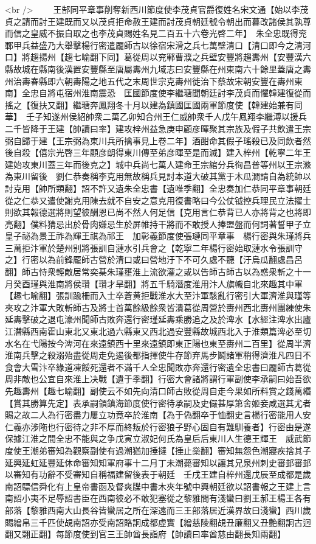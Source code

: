 <br />
　　王郜同平章事削奪新西川節度使李茂貞官爵復姓名宋文通【始以李茂貞之請而討王建既而又以茂貞拒命赦王建而討茂貞朝廷號令朝出而暮改諸侯其孰尊而信之皇威不振自取之也李茂貞賜姓名見二百五十六卷光啓二年】　朱全忠既得兖鄆甲兵益盛乃大舉擊楊行密遣龎師古以徐宿宋滑之兵七萬壁清口【清口即今之清河口】將趨揚州【趨七喻翻下同】葛從周以兖鄆曹濮之兵壁安豐將趨夀州【安豐漢六縣故城在縣南後漢置安豐縣至唐屬夀州九域志曰安豐縣在州東南六十餘里蓋唐之夀州治夀春縣即六朝夀陽之地五代之末周世宗克夀州徙治下蔡故宋朝安豐在夀州東南】全忠自將屯宿州淮南震恐　匡國節度使李繼瑭聞朝廷討李茂貞而懼韓建復從而搖之【復扶又翻】繼瑭奔鳳翔冬十月以建為鎮國匡國兩軍節度使【韓建始兼有同華】　壬子知遂州侯紹帥衆二萬乙卯知合州王仁威帥衆千人戊午鳳翔李繼溥以援兵二千皆降于王建【帥讀曰率】建攻梓州益急庚申顧彦暉聚其宗族及假子共飲遣王宗弼自歸于建【王宗弼為東川兵所擒事見上卷二年】酒酣命其假子瑤殺已及同飲者然後自殺【僖宗光啓三年顧彦朗得東川傳至弟彦暉至是而滅】建入梓州【乾寧二年王建始攻東川蓋三年而後克之】城中兵尚七萬人建命王宗綰分兵徇昌普等州以王宗滌為東川留後　劉仁恭奏稱李克用無故稱兵見討本道大破其黨于木瓜澗請自為統帥以討克用【帥所類翻】詔不許又遺朱全忠書【遺唯季翻】全忠奏加仁恭同平章事朝廷從之仁恭又遣使謝克用陳去就不自安之意克用復書略曰今公仗钺控兵理民立法擢士則欲其報德選將則望彼酬恩已尚不然人何足信【克用言仁恭背已人亦將背之也將即亮翻】僕料猜忌出於骨肉嫌忌生於屏帷持干將而不敢授人捧盟盤而何詞著誓甲子立皇子祕為景王祚為輝王祺為祁王　加彰義節度使張璉同平章事　楊行密與朱瑾將兵三萬拒汴軍於楚州别將張訓自漣水引兵會之【乾寧二年楊行密始取漣水令張訓守之】行密以為前鋒龎師古營於清口或曰營地汙下不可久處不聽【汙烏瓜翻處昌呂翻】師古恃衆輕敵居常奕棊朱瑾壅淮上流欲灌之或以告師古師古以為惑衆斬之十一月癸酉瑾與淮南將侯瓚【瓚才旱翻】將五千騎潛度淮用汴人旗幟自北來趣其中軍【趣七喻翻】張訓踰柵而入士卒蒼黄拒戰淮水大至汴軍駭亂行密引大軍濟淮與瑾等夾攻之汴軍大敗斬師古及將士首萬餘級餘衆皆潰葛從周營於夀州西北夀州團練使朱延夀擊破之退屯濠州聞師古敗奔還行密瑾延夀乘勝追之及於渒水【水經注渒水出廬江潛縣西南霍山東北又東北過六縣東又西北過安豐縣故城西北入于淮類篇渒必至切水名在弋陽按今渒河在來遠鎮西十里來遠鎮即東正陽也東至夀州二百里】從周半濟淮南兵擊之殺溺殆盡從周走免遏後都指揮使牛存節弃馬步鬭諸軍稍得濟淮凡四日不食會大雪汴卒緣道凍餒死還者不滿千人全忠聞敗亦奔還行密遺全忠書曰龎師古葛從周非敵也公宜自來淮上决戰【遺于季翻】行密大會諸將謂行軍副使李承嗣曰始吾欲先趣夀州【趣七喻翻】副使云不如先向清口師古敗從周自走今果如所料賞之錢萬緡【賞其勝算先定】表承嗣領鎮海節度使行密待承嗣及史儼甚厚第舍姬妾咸選其尤者賜之故二人為行密盡力屢立功竟卒於淮南【為于偽翻卒于恤翻史言楊行密能用人安仁義亦涉陁也行密待之非不厚而終叛於行密狼子野心固自有難馴養者】行密由是遂保據江淮之間全忠不能與之争戊寅立淑妃何氏為皇后后東川人生德王輝王　威武節度使王潮弟審知為觀察副使有過潮猶加捶撻【捶止橤翻】審知無怨色潮寢疾捨其子延興延虹延豐延休命審知知軍府事十二月丁未潮薨審知以讓其兄泉州刺史審邽審邽以審知有功辭不受審知自稱福建留後表于朝廷　壬戌王建自梓州還戊辰至成都是歲南詔驃信舜化有上皇帝書函及督爽牒中書木夾年號中興朝廷欲以詔書報之王建上言南詔小夷不足辱詔書臣在西南彼必不敢犯塞從之黎雅間有淺蠻曰劉王郝王楊王各有部落【黎雅西南大山長谷皆蠻居之所在深遠而三王部落居近漢界故曰淺蠻】西川歲賜繒帛三千匹使覘南詔亦受南詔賂詗成都虛實【繒慈陵翻覘丑廉翻又丑艶翻詗古迥翻又翾正翻】每節度使到官三王帥酋長詣府【帥讀曰率酋慈由翻長知兩翻】